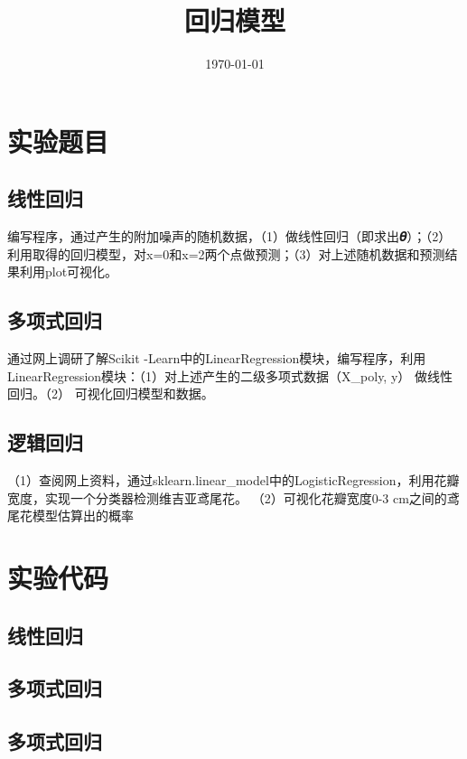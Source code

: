 \documentclass{../source/Experiment}
\title{回归模型}
\date{\today}
\begin{document}
    \makecover
    \section{实验题目}
        \subsection{线性回归}
        编写程序，通过产生的附加噪声的随机数据，（1）做线性回归（即求出𝜽）；（2）利用取得的回归模型，对x=0和x=2两个点做预测；（3）对上述随机数据和预测结果利用plot可视化。

        \subsection{多项式回归}
       
        通过网上调研了解Scikit -Learn中的LinearRegression模块，编写程序，利用LinearRegression模块：（1）对上述产生的二级多项式数据（X\_poly, y） 做线性回归。（2） 可视化回归模型和数据。


        \subsection{逻辑回归}

        （1）查阅网上资料，通过sklearn.linear\_model中的LogisticRegression，利用花瓣宽度，实现一个分类器检测维吉亚鸢尾花。
        （2）可视化花瓣宽度0-3 cm之间的鸢尾花模型估算出的概率
    
    \section{实验代码}
    \subsection{线性回归}
    
    
    \subsection{多项式回归}
    
    \subsection{多项式回归}
\end{document}
